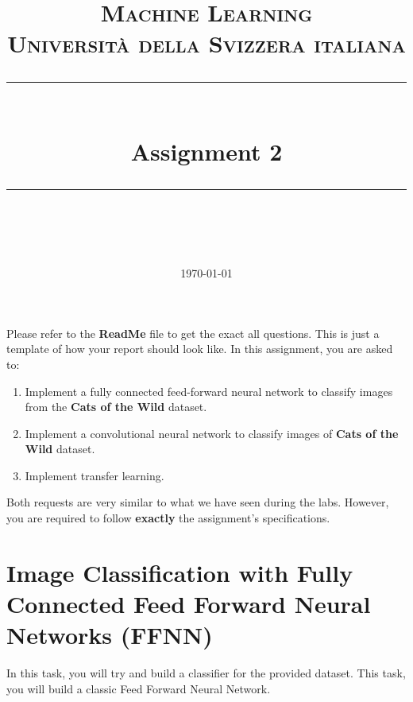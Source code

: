 \documentclass[11pt]{scrartcl}
\title{	
	\normalfont\normalsize
	\textsc{Machine Learning\\%
	Universit\`a della Svizzera italiana}\\
	\vspace{25pt}
	\rule{\linewidth}{0.5pt}\\
	\vspace{20pt}
	{\huge Assignment 2}\\
	\vspace{12pt}
	\rule{\linewidth}{1pt}\\
	\vspace{12pt}
}
\author{\LARGE \thestudent}
\date{\normalsize\today}
\begin{document}
\maketitle

Please refer to the \textbf{ReadMe} file to get the exact all questions. 
This is just a template of how your report should look like.
In this assignment, you are asked to:

\begin{enumerate}
\item Implement a fully connected feed-forward neural network to classify images 
from the \textbf{Cats of the Wild} dataset.

\item Implement a convolutional neural network to classify images of 
\textbf{Cats of the Wild} dataset.

\item Implement transfer learning.
\end{enumerate}


Both requests are very similar to what we have seen during the labs. 
However, you are required to follow \textbf{exactly} the assignment's specifications.

\section{Image Classification with Fully Connected Feed Forward Neural Networks (FFNN)}

In this task, you will try and build a classifier for the provided dataset. This task, you will build a classic Feed Forward Neural Network.
\end{document}
